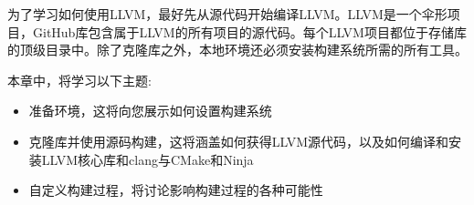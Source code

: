 为了学习如何使用LLVM，最好先从源代码开始编译LLVM。LLVM是一个伞形项目，GitHub库包含属于LLVM的所有项目的源代码。每个LLVM项目都位于存储库的顶级目录中。除了克隆库之外，本地环境还必须安装构建系统所需的所有工具。

本章中，将学习以下主题:

\begin{itemize}
\item
准备环境，这将向您展示如何设置构建系统

\item
克隆库并使用源码构建，这将涵盖如何获得LLVM源代码，以及如何编译和安装LLVM核心库和clang与CMake和Ninja

\item
自定义构建过程，将讨论影响构建过程的各种可能性
\end{itemize}








